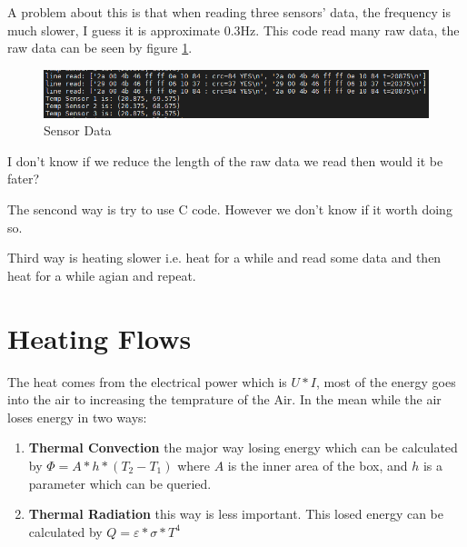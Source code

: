 \documentclass{article}
\begin{document}
A problem about this is that when reading three sensors' data, the frequency is much slower, I guess it is approximate 0.3Hz. This code read many raw data, the raw data can be seen by figure \ref{fig:sensordata}.
\begin{figure}
\begin{center}
\includegraphics[scale=0.8]{sensorRawData.png}
\end{center}
\caption{Sensor Data}
\label{fig:sensordata}
\end{figure}

I don't know if we reduce the length of the raw data we read then would it be fater?  

The sencond way is try to use C code. However we don't know if it worth doing so.

Third way is heating slower i.e. heat for a while and read some data and then heat for a while agian and repeat. 

\section{Heating Flows}

The heat comes from the electrical  power which is $U*I$, most of the energy goes into the air to increasing the temprature of the Air. In the mean while the air loses energy in two ways:
\begin{enumerate}
\item \textbf{Thermal Convection} the major way losing energy which can be calculated by $\Phi=A*h*(T_2-T_1)$ where $A$ is the inner area of the box, and $h$ is a parameter which can be queried. 
\item \textbf{Thermal Radiation} this way is less important. This losed energy can be calculated by $Q=\varepsilon*\sigma *T^4$
\end{enumerate}
\end{document}
